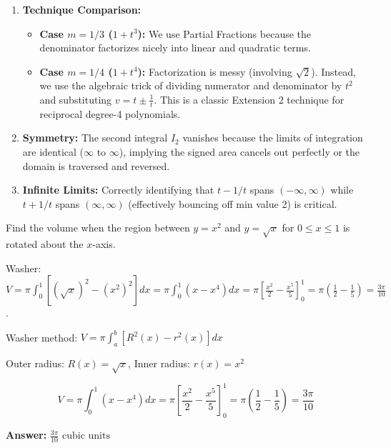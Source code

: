\begin{takeaways}
\begin{enumerate}
    \item \textbf{Technique Comparison:}
    \begin{itemize}
        \item \textbf{Case $m=1/3$ ($1+t^3$):} We use Partial Fractions because the denominator factorizes nicely into linear and quadratic terms.
        \item \textbf{Case $m=1/4$ ($1+t^4$):} Factorization is messy (involving $\sqrt{2}$). Instead, we use the algebraic trick of dividing numerator and denominator by $t^2$ and substituting $v = t \pm \frac{1}{t}$. This is a classic Extension 2 technique for reciprocal degree-4 polynomials.
    \end{itemize}
    \item \textbf{Symmetry:} The second integral $I_2$ vanishes because the limits of integration are identical ($\infty$ to $\infty$), implying the signed area cancels out perfectly or the domain is traversed and reversed.
    \item \textbf{Infinite Limits:} Correctly identifying that $t - 1/t$ spans $(-\infty, \infty)$ while $t + 1/t$ spans $(\infty, \infty)$ (effectively bouncing off min value 2) is critical.
\end{enumerate}
\end{takeaways}


\begin{problem}
Find the volume when the region between $y = x^2$ and $y = \sqrt{x}$ for $0 \leq x \leq 1$ is rotated about the $x$-axis.
\end{problem}

\begin{hint}
Washer: $V = \pi\int_0^1 [(\sqrt{x})^2 - (x^2)^2]dx = \pi\int_0^1 (x - x^4)dx = \pi\left[\frac{x^2}{2} - \frac{x^5}{5}\right]_0^1 = \pi\left(\frac{1}{2} - \frac{1}{5}\right) = \frac{3\pi}{10}$.
\end{hint}

\begin{solution}
Washer method: $V = \pi\int_a^b[R^2(x) - r^2(x)]dx$

Outer radius: $R(x)=\sqrt{x}$, Inner radius: $r(x)=x^2$

\[
V = \pi\int_0^1(x - x^4)dx = \pi\left[\frac{x^2}{2} - \frac{x^5}{5}\right]_0^1 = \pi\left(\frac{1}{2}-\frac{1}{5}\right) = \frac{3\pi}{10}
\]

\textbf{Answer:} $\boxed{\frac{3\pi}{10} \text{ cubic units}}$
\end{solution}

